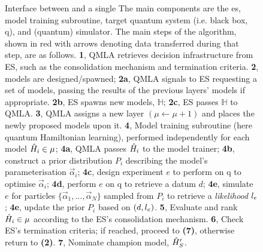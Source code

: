 \begin{figure}
\begin{center}
\begin{tikzpicture}[node distance=2.25cm]
    \end{tikzpicture}
    \end{center}
    
    \caption[Interface between  and a single ]{
        Interface between  and a single 
        The main components are the \gls{es}, model training subroutine, target quantum system (i.e. black box, \gls{q}), 
        and (quantum) simulator. 
        The main steps of the algorithm, shown in red with arrows denoting data transferred during that step, are as follows.
        \textbf{1}, QMLA retrieves decision infrastructure from ES, such as the consolidation mechanism and termination criteria.
        \textbf{2}, models are designed/spawned; 
        \textbf{2a}, QMLA signals to ES requesting a set of models, passing the results of the previous layers' models if appropriate.
        \textbf{2b}, ES spawns new models, $\mathbb{H}$;
        \textbf{2c}, ES passes $\mathbb{H}$ to QMLA. 
        \textbf{3}, QMLA assigns a new layer $(\mu \gets \mu + 1)$ and places the newly proposed models upon it.
        \textbf{4}, Model training subroutine (here quantum Hamiltonian learning), performed independently for each model $\hi \in \mu$; 
        \textbf{4a}, QMLA passes $\hi$ to the model trainer; 
        \textbf{4b}, construct a prior distribution $P_i$ describing the model's parameterisation $\vec{\alpha}_i$;
        \textbf{4c}, design experiment $e$ to perform on \gls{q} to optimise $\vec{\alpha}_i$;
        \textbf{4d}, perform $e$ on \gls{q} to retrieve a datum $d$;
        \textbf{4e}, simulate $e$ for particles $\{ \vec{\alpha}_1, \dots , \vec{\alpha}_N \}$ 
            sampled from $P_i$ to retrieve a \emph{likelihood} $\lk_{e}$;
        \textbf{4e}, update the prior $P_i$ based on $(d, \lk_{e})$.
        \textbf{5}, Evaluate and rank $\hi \in \mu$ according to the ES's consolidation mechanism.
        \textbf{6}, Check ES's termination criteria; if reached, proceed to \textbf{(7)}, otherwise return to \textbf{(2)}.
        \textbf{7}, Nominate \gls{champion model}, $\hp_{S}$.        
    }
    \label{fig:qmla_flow}
\end{figure}

   